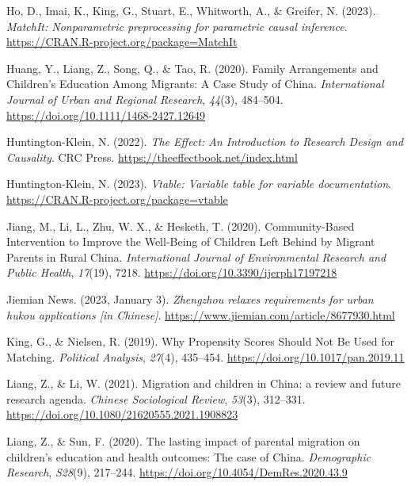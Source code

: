 \documentclass[
  man]{apa7}
\newlength{\cslhangindent}
\newlength{\cslentryspacingunit} %
\newenvironment{CSLReferences}[2] %
 {%
  \setlength{\parindent}{0pt}
  \ifodd #1
  \let\oldpar\par
  \def\par{\hangindent=\cslhangindent\oldpar}
  \fi
  \setlength{\parskip}{#2\cslentryspacingunit}
 }%
 {}
\begin{document}
\begin{CSLReferences}{1}{0}
\leavevmode{}%
Ho, D., Imai, K., King, G., Stuart, E., Whitworth, A., \& Greifer, N. (2023). \emph{MatchIt: Nonparametric preprocessing for parametric causal inference}. \url{https://CRAN.R-project.org/package=MatchIt}

\leavevmode{}%
Huang, Y., Liang, Z., Song, Q., \& Tao, R. (2020). Family Arrangements and Children's Education Among Migrants: A Case Study of {China}. \emph{International Journal of Urban and Regional Research}, \emph{44}(3), 484--504. \url{https://doi.org/10.1111/1468-2427.12649}

\leavevmode{}%
Huntington-Klein, N. (2022). \emph{The Effect: An Introduction to Research Design and Causality}. CRC Press. \url{https://theeffectbook.net/index.html}

\leavevmode{}%
Huntington-Klein, N. (2023). \emph{Vtable: Variable table for variable documentation}. \url{https://CRAN.R-project.org/package=vtable}

\leavevmode{}%
Jiang, M., Li, L., Zhu, W. X., \& Hesketh, T. (2020). Community-Based Intervention to Improve the Well-Being of Children Left Behind by Migrant Parents in Rural {China}. \emph{International Journal of Environmental Research and Public Health}, \emph{17}(19), 7218. \url{https://doi.org/10.3390/ijerph17197218}

\leavevmode{}%
Jiemian News. (2023, January 3). \emph{Zhengzhou relaxes requirements for urban hukou applications {[}in {Chinese}{]}}. \url{https://www.jiemian.com/article/8677930.html}

\leavevmode{}%
King, G., \& Nielsen, R. (2019). Why Propensity Scores Should Not Be Used for Matching. \emph{Political Analysis}, \emph{27}(4), 435--454. \url{https://doi.org/10.1017/pan.2019.11}

\leavevmode{}%
Liang, Z., \& Li, W. (2021). Migration and children in {China}: a review and future research agenda. \emph{Chinese Sociological Review}, \emph{53}(3), 312--331. \url{https://doi.org/10.1080/21620555.2021.1908823}

\leavevmode{}%
Liang, Z., \& Sun, F. (2020). The lasting impact of parental migration on children's education and health outcomes: The case of {China}. \emph{Demographic Research}, \emph{S28}(9), 217--244. \url{https://doi.org/10.4054/DemRes.2020.43.9}


\end{CSLReferences}
\end{document}
